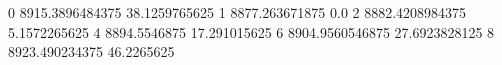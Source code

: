 0 8915.3896484375 38.1259765625
1 8877.263671875 0.0
2 8882.4208984375 5.1572265625
4 8894.5546875 17.291015625
6 8904.9560546875 27.6923828125
8 8923.490234375 46.2265625
